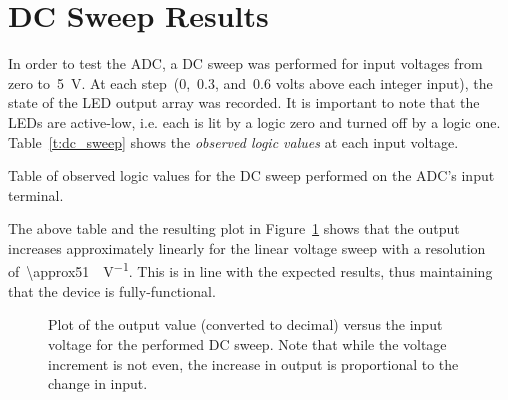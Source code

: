 \section{DC Sweep Results}
In order to test the ADC, a DC sweep was performed for input voltages from zero
to~\SI{5}{\volt}.  At each step~(0,~0.3, and~0.6 volts above each integer
input), the state of the LED output array was recorded.  It is important to
note that the LEDs are active-low, i.e. each is lit by a logic zero and turned
off by a logic one.  Table~\ref{t:dc_sweep} shows the \emph{observed logic
values} at each input voltage.
%
\begin{table}[H]
\centering
	
	\parbox{.6\textwidth}{
	\caption[DC sweep results --- Data]{Table of observed logic values for the DC sweep
	performed on the ADC's input terminal.}
	\label{t:dc_sweep}}
\end{table}
%
The above table and the resulting plot in Figure~\ref{f:dc_sweep} shows that
the output increases approximately linearly for the linear voltage sweep with a
resolution of~\SI{\approx51}{\bit\per\volt}.  This is in line with the expected
results, thus maintaining that the device is fully-functional.
%
\begin{figure}[H]
\centering
	
	\parbox{4.25in}{
	\caption[DC sweep results --- Plot]{Plot of the output value (converted to
	decimal) versus the input voltage for the performed DC sweep.  Note that
	while the voltage increment is not even, the increase in output is
	proportional to the change in input.}
	\label{f:dc_sweep}}
\end{figure}
